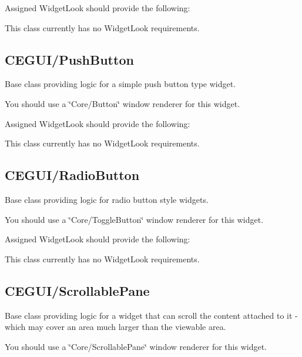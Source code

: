 Assigned Widget\+Look should provide the following\+: 
\begin{DoxyItemize}
\item This class currently has no Widget\+Look requirements. 
\end{DoxyItemize}\hypertarget{fal_baseclass_ref_fal_baseclass_ref_sec_19}{}\subsection{C\+E\+G\+U\+I/\+Push\+Button}\label{fal_baseclass_ref_fal_baseclass_ref_sec_19}
Base class providing logic for a simple push button type widget.

You should use a \char`\"{}\+Core/\+Button\char`\"{} window renderer for this widget.

Assigned Widget\+Look should provide the following\+: 
\begin{DoxyItemize}
\item This class currently has no Widget\+Look requirements. 
\end{DoxyItemize}\hypertarget{fal_baseclass_ref_fal_baseclass_ref_sec_20}{}\subsection{C\+E\+G\+U\+I/\+Radio\+Button}\label{fal_baseclass_ref_fal_baseclass_ref_sec_20}
Base class providing logic for radio button style widgets.

You should use a \char`\"{}\+Core/\+Toggle\+Button\char`\"{} window renderer for this widget.

Assigned Widget\+Look should provide the following\+: 
\begin{DoxyItemize}
\item This class currently has no Widget\+Look requirements. 
\end{DoxyItemize}\hypertarget{fal_baseclass_ref_fal_baseclass_ref_sec_21}{}\subsection{C\+E\+G\+U\+I/\+Scrollable\+Pane}\label{fal_baseclass_ref_fal_baseclass_ref_sec_21}
Base class providing logic for a widget that can scroll the content attached to it -\/ which may cover an area much larger than the viewable area.

You should use a \char`\"{}\+Core/\+Scrollable\+Pane\char`\"{} window renderer for this widget.

